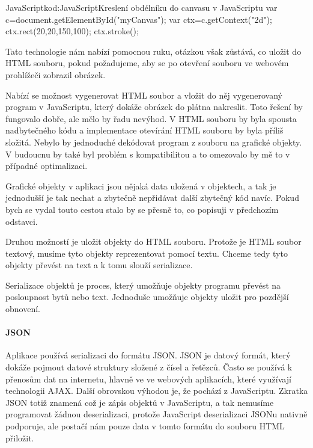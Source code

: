 \documentclass[
  field=inf,
  biblatex,
  glossaries,
  index
]{kidiplom}
\begin{document}
\begin{kicode}{JavaScript}{kod:JavaScript}{Kreslení obdélníku do canvasu v JavaScriptu}
var c=document.getElementById("myCanvas");
var ctx=c.getContext("2d");
ctx.rect(20,20,150,100);
ctx.stroke();
\end{kicode}

Tato technologie nám nabízí pomocnou ruku, otázkou však zůstává, co uložit do HTML souboru, pokud požadujeme, aby se po otevření souboru ve webovém prohlížeči zobrazil obrázek.

Nabízí se možnost vygenerovat HTML soubor a vložit do něj vygenerovaný program v JavaScriptu, který dokáže obrázek do plátna nakreslit. Toto řešení by fungovalo dobře, ale mělo by řadu nevýhod. V HTML souboru by byla spousta nadbytečného kódu a implementace otevírání HTML souboru by byla příliš složitá. Nebylo by jednoduché dekódovat program z souboru na grafické objekty. V budoucnu by také byl problém s kompatibilitou a to omezovalo by mě to v případné optimalizaci.

Grafické objekty v aplikaci jsou nějaká data uložená v objektech, a tak je jednodušší je tak nechat a zbytečně nepřidávat další zbytečný kód navíc. Pokud bych se vydal touto cestou stalo by se přesně to, co popisuji v předchozím odstavci.

Druhou možností je uložit objekty do HTML souboru. Protože je HTML soubor textový, musíme tyto objekty reprezentovat pomocí textu. Chceme tedy tyto objekty převést na text a k tomu slouží serializace.

Serializace objektů je proces, který umožňuje objekty programu převést na posloupnost bytů nebo text. Jednoduše umožňuje objekty uložit pro pozdější obnovení.



\paragraph{JSON}
Aplikace používá serializaci do formátu JSON. JSON je datový formát, který dokáže pojmout datové struktury složené z čísel a řetězců. Často se používá k přenosům dat na internetu, hlavně ve ve webových aplikacích, které využívají technologii AJAX. Další obrovskou výhodou je, že pochází z JavaScriptu. Zkratka JSON totiž znamená  což je zápis objektů v JavaScriptu, a tak nemusíme programovat žádnou deserializaci, protože JavaScript deserializaci JSONu nativně podporuje, ale postačí nám pouze data v tomto formátu do souboru HTML přiložit.
\end{document}

